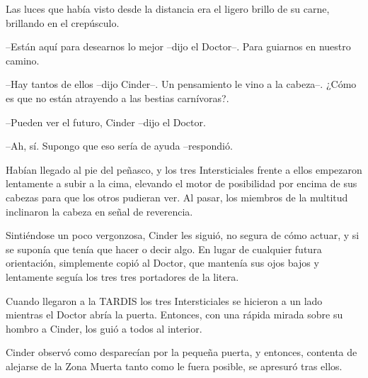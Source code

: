 Las luces que había visto desde la distancia era el ligero brillo de su carne, brillando en el crepúsculo.



--Están aquí para desearnos lo mejor --dijo el Doctor--. Para guiarnos en nuestro camino.

--Hay tantos de ellos --dijo Cinder--. Un pensamiento le vino a la cabeza--. ¿Cómo es que no están atrayendo a las bestias carnívoras?.

--Pueden ver el futuro, Cinder --dijo el Doctor.

--Ah, sí. Supongo que eso sería de ayuda --respondió.



Habían llegado al pie del peñasco, y los tres Intersticiales frente a ellos empezaron lentamente a subir a la cima, elevando el motor de posibilidad por encima de sus cabezas para que los otros pudieran ver. Al pasar, los miembros de la multitud inclinaron la cabeza en señal de reverencia.

Sintiéndose un poco vergonzosa, Cinder les siguió, no segura de cómo actuar, y si se suponía que tenía que hacer o decir algo. En lugar de cualquier futura orientación, simplemente copió al Doctor, que mantenía sus ojos bajos y lentamente seguía los tres tres portadores de la litera.

Cuando llegaron a la TARDIS los tres Intersticiales se hicieron a un lado mientras el Doctor abría la puerta. Entonces, con una rápida mirada sobre su hombro a Cinder, los guió a todos al interior.

Cinder observó como desparecían por la pequeña puerta, y entonces, contenta de alejarse de la Zona Muerta tanto como le fuera posible, se apresuró tras ellos.



